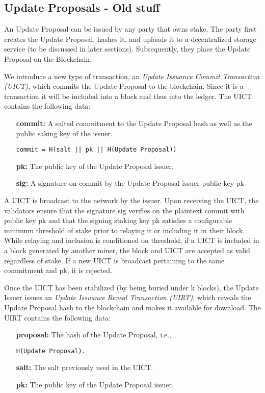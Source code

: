 \subsection*{Update Proposals - Old stuff}
An Update Proposal can be issued by any party that owns stake. The party first creates the Update Proposal, hashes it, and uploads it to a decentralized storage service (to be discussed in later sections). Subsequently, they place the Update Proposal on the Blockchain.

We introduce a new type of transaction, an \emph{Update Issuance Commit Transaction (UICT)}, which commits the Update Proposal to the blockchain. Since it is a transaction it will be included into a block and thus into the ledger. The UICT contains the following data:

\begin{itemize}
\item[\textbf{commit:}] A salted commitment to the Update Proposal hash as well as the public saking key of the issuer. 
\begin{verbatim}
commit = H(salt || pk || H(Update Proposal))
\end{verbatim}
\item[\textbf{pk:}] The public key of the Update Proposal issuer.
\item[\textbf{sig:}] A signature on commit by the Update Proposal issuer public key pk
\end{itemize}

A UICT is broadcast to the network by the issuer. Upon receiving the UICT, the validators ensure that the signature sig verifies on the plaintext commit with public key pk and that the signing staking key pk satisfies a configurable minimum threshold of stake prior to relaying it or including it in their block. While relaying and inclusion is conditioned on threshold, if a UICT is included in a block generated by another miner, the block and UICT are accepted as valid regardless of stake. If a new UICT is broadcast pertaining to the same commitment and pk, it is rejected.

Once the UICT has been stabilized (by being buried under k blocks), the Update Issuer issues an \emph{Update Issuance Reveal Transaction (UIRT)}, which reveals the Update Proposal hash to the blockchain and makes it available for download. The UIRT contains the following data:

\begin{itemize}
\item[\textbf{proposal:}] 
The hash of the Update Proposal, 
i.e., %
\begin{verbatim}
H(Update Proposal).
\end{verbatim}
\item[\textbf{salt:}] The salt previously used in the UICT.
\item[\textbf{pk:}] The public key of the Update Proposal issuer.
\end{itemize}

